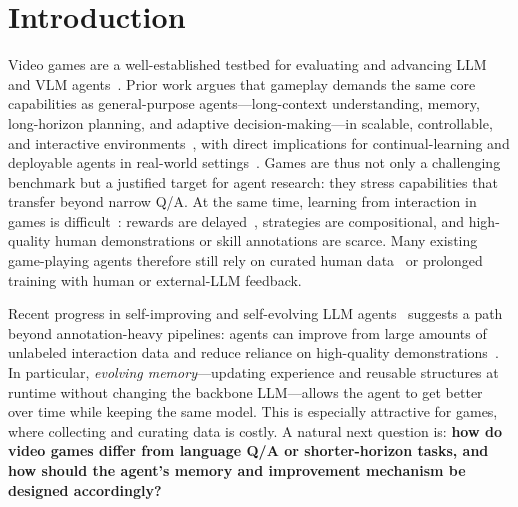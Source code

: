 \section{Introduction}
\label{sec:intro}

Video games are a well-established testbed for evaluating and advancing LLM and VLM agents~\cite{berner2019dota, xu2025agents}. Prior work argues that gameplay demands the same core capabilities as general-purpose agents---long-context understanding, memory, long-horizon planning, and adaptive decision-making---in scalable, controllable, and interactive environments~\cite{wang2023voyager, raad2024scaling}, with direct implications for continual-learning and deployable agents in real-world settings~\cite{hu2024survey}. Games are thus not only a challenging benchmark but a justified target for agent research: they stress capabilities that transfer beyond narrow Q/A. At the same time, learning from interaction in games is difficult~\cite{liao2025think, lu2025cultivating}: rewards are delayed~\cite{liu2025agentic}, strategies are compositional, and high-quality human demonstrations or skill annotations are scarce. Many existing game-playing agents therefore still rely on curated human data~\cite{hu2023language} or prolonged training with human or external-LLM feedback.

Recent progress in self-improving and self-evolving LLM agents~\cite{li2025self, wang2025vision, he2025visplay, huang2025r} suggests a path beyond annotation-heavy pipelines: agents can improve from large amounts of unlabeled interaction data and reduce reliance on high-quality demonstrations~\cite{gao2025survey, xiangsystematic}. In particular, \emph{evolving memory}---updating experience and reusable structures at runtime without changing the backbone LLM---allows the agent to get better over time while keeping the same model. This is especially attractive for games, where collecting and curating data is costly. A natural next question is: \textbf{how do video games differ from language Q/A or shorter-horizon tasks, and how should the agent's memory and improvement mechanism be designed accordingly?}

